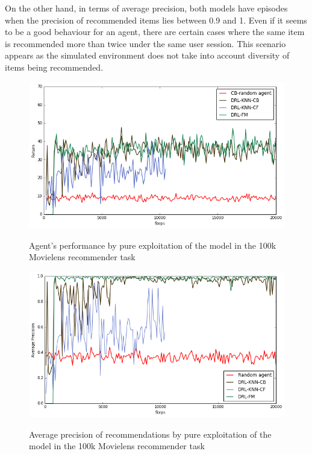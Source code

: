 On the other hand, in terms of average precision, both models have episodes when the precision of recommended items lies between 0.9 and 1. Even if it seems to be a good behaviour for an agent, there are certain cases where the same item is recommended more than twice under the same user session. This scenario appears as the simulated environment does not take into account diversity of items being recommended.

\begin{figure}[t]
\centering
\caption{Agent's performance by pure exploitation of the model in the 100k Movielens recommender task}
\includegraphics[scale=0.6]{images/eval_return_test}
\label{fig:return_test}
\end{figure}

\begin{figure}[t]
\centering
\caption{Average precision of recommendations by pure exploitation of the model in the 100k Movielens recommender task}
\includegraphics[scale=0.6]{images/eval_precision_test}
\label{fig:precision_test}
\end{figure}